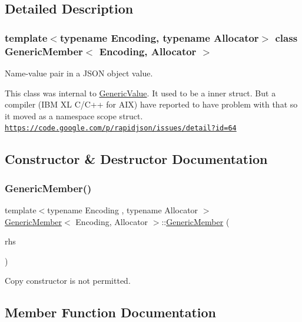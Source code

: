 \subsection{Detailed Description}
\subsubsection*{template$<$typename Encoding, typename Allocator$>$\newline
class Generic\+Member$<$ Encoding, Allocator $>$}

Name-\/value pair in a J\+S\+ON object value. 

This class was internal to \hyperlink{classGenericValue}{Generic\+Value}. It used to be a inner struct. But a compiler (I\+BM XL C/\+C++ for A\+IX) have reported to have problem with that so it moved as a namespace scope struct. \href{https://code.google.com/p/rapidjson/issues/detail?id=64}{\tt https\+://code.\+google.\+com/p/rapidjson/issues/detail?id=64} 

\subsection{Constructor \& Destructor Documentation}
\mbox{\label{classGenericMember_ab9c79af91543b05cc88af0f930e7556e}} 
\subsubsection{\texorpdfstring{Generic\+Member()}{GenericMember()}}
{\footnotesize\ttfamily template$<$typename Encoding , typename Allocator $>$ \\
\hyperlink{classGenericMember}{Generic\+Member}$<$ Encoding, Allocator $>$\+::\hyperlink{classGenericMember}{Generic\+Member} (\begin{DoxyParamCaption}\item[{const \hyperlink{classGenericMember}{Generic\+Member}$<$ Encoding, Allocator $>$ \&}]{rhs }\end{DoxyParamCaption})\hspace{0.3cm}{\ttfamily [private]}}



Copy constructor is not permitted. 



\subsection{Member Function Documentation}
\mbox{\label{classGenericMember_aa6983171b50bdcbb6a456d369680b379}} 
